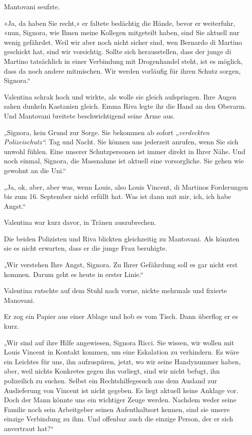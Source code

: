 Mantovani seufzte.

«Ja, da haben Sie recht,» er faltete bedächtig die Hände, bevor er
weiterfuhr, «nun, Signora, wie Ihnen meine Kollegen mitgeteilt haben,
sind Sie aktuell nur wenig gefährdet. Weil wir aber noch nicht sicher
sind, wen Bernardo di Martino geschickt hat, sind wir vorsichtig. Sollte
sich herausstellen, dass der junge di Martino tatsächlich in einer
Verbindung mit Drogenhandel steht, ist es möglich, dass da noch andere
mitmischen. Wir werden vorläufig für ihren Schutz sorgen, Signora.``

Valentina schrak hoch und wirkte, als wolle sie gleich aufspringen. Ihre
Augen sahen dunkeln Kastanien gleich. Emma Riva legte ihr die Hand an
den Oberarm. Und Mantovani breitete beschwichtigend seine Arme aus.

„Signora, kein Grund zur Sorge. Sie bekommen ab sofort „\emph{verdeckten
Polizeischutz``.} Tag und Nacht. Sie können uns jederzeit anrufen, wenn
Sie sich unwohl fühlen. Eine unserer Schutzpersonen ist immer direkt in
Ihrer Nähe. Und noch einmal, Signora, die Massnahme ist aktuell eine
vorsorgliche. Sie gehen wie gewohnt an die Uni.``

„Ja, ok, aber, aber was, wenn Louis, also Louis Vincent, di Martinos
Forderungen bis zum 16. September nicht erfüllt hat. Was ist dann mit
mir, ich, ich habe Angst.``

Valentina war kurz davor, in Tränen auszubrechen.

Die beiden Polizisten und Riva blickten gleichzeitig zu Mantovani. Als
könnten sie es nicht erwarten, dass er die junge Frau beruhigte.

„Wir verstehen Ihre Angst, Signora. Zu Ihrer Gefährdung soll es gar
nicht erst kommen. Darum geht es heute in erster Linie.``

Valentina rutschte auf dem Stuhl nach vorne, nickte mehrmals und
fixierte Manovani.

Er zog ein Papier aus einer Ablage und hob es vom Tisch. Dann überflog
er es kurz.

„Wir sind auf ihre Hilfe angewiesen, Signora Ricci. Sie wissen, wir
wollen mit Louis Vincent in Kontakt kommen, um eine Eskalation zu
verhindern. Es wäre ein Leichtes für uns, ihn aufzuspüren, jetzt, wo wir
seine Handynummer haben, aber, weil nichts Konkretes gegen ihn vorliegt,
sind wir nicht befugt, ihn polizeilich zu suchen. Selbst ein
Rechtshilfegesuch aus dem Ausland zur Auslieferung von Vincent ist nicht
gegeben. Es liegt aktuell keine Anklage vor. Doch der Mann könnte uns
ein wichtiger Zeuge werden. Nachdem weder seine Familie noch sein
Arbeitgeber seinen Aufenthaltsort kennen, sind sie unsere einzige
Verbindung zu ihm. Und offenbar auch die einzige Person, der er sich
anvertraut hat?{\kern0pt}``

